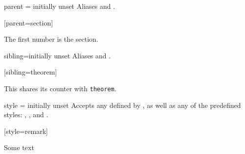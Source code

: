 \documentclass{ltxdoc}
\begin{document}
\begin{docKey}{parent}
  {=}
  {initially unset}
Aliases  and .

\begin{tcbwritetemp}
[parent=section]
\end{tcbwritetemp}

\begin{keythmscode}[withpreamble]
\begin{conjecture}
The first number is the section.
\end{conjecture}
\end{keythmscode}

\end{docKey}

\begin{docKey}{sibling}{=}{initially unset}
Aliases  and .

\begin{tcbwritetemp}
[sibling=theorem]
\end{tcbwritetemp}

\begin{keythmscode}[withpreamble]
\begin{lemma}
This shares its counter with
\texttt{theorem}.
\end{lemma}
\end{keythmscode}

\end{docKey}

\begin{docKey}{style}
  {=}
  {initially unset}
Accepts any  defined by , as well as any of the predefined  styles: , , and .

\begin{tcbwritetemp}
[style=remark]
\end{tcbwritetemp}

\begin{keythmscode}[withpreamble]
\begin{remark}
Some text
\end{remark}
\end{keythmscode}

\end{docKey}
\end{document}
